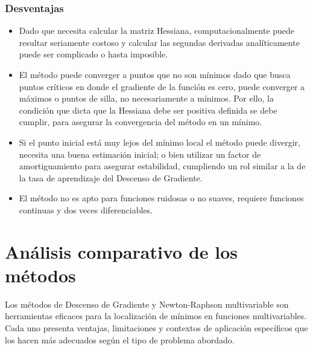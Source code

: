 \documentclass[conference]{IEEEtran}
\begin{document}
\subsubsection{Desventajas}
\begin{itemize}
    \item Dado que necesita calcular la matriz Hessiana, computacionalmente puede resultar seriamente costoso y calcular las segundas derivadas analíticamente puede ser complicado o hasta imposible.
    \item El método puede converger a puntos que no son mínimos dado que busca puntos críticos en donde el gradiente de la función es cero, puede converger a máximos o puntos de silla, no necesariamente a mínimos. Por ello, la condición que dicta que la Hessiana debe ser positiva definida se debe cumplir, para asegurar la convergencia del método en un mínimo.
    \item Si el punto inicial está muy lejos del mínimo local el método puede divergir, necesita una buena estimación inicial; o bien utilizar un factor de amortiguamiento para asegurar estabilidad, cumpliendo un rol similar a la de la tasa de aprendizaje del Descenso de Gradiente.
    \item El método no es apto para funciones ruidosas o no suaves, requiere funciones continuas y dos veces diferenciables.
\end{itemize}

\section{Análisis comparativo de los métodos}
Los métodos de Descenso de Gradiente y Newton-Raphson multivariable son herramientas eficaces para la localización de mínimos en funciones multivariables. Cada uno presenta ventajas, limitaciones y contextos de aplicación específicos que los hacen más adecuados según el tipo de problema abordado.
\end{document}
